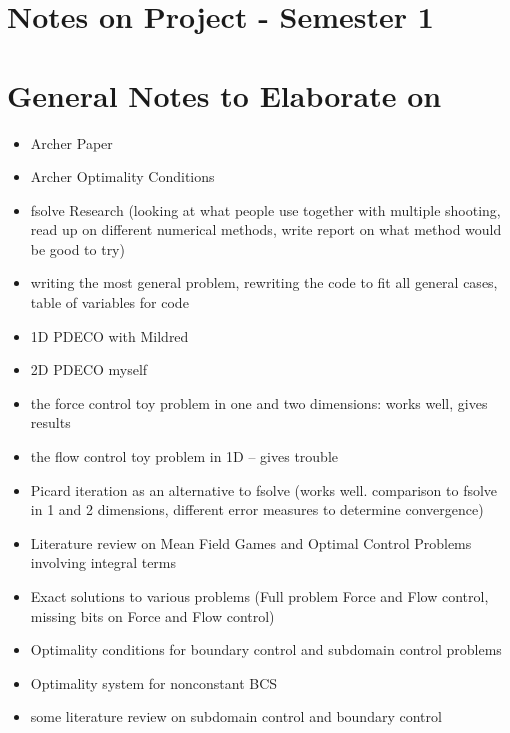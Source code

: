 \documentclass[11pt, a4paper]{article}
\theoremstyle{definition}
\begin{document}

\section*{Notes on Project - Semester 1}

\section{General Notes to Elaborate on}

\begin{itemize}
	\item Archer Paper
	\item Archer Optimality Conditions
	\item fsolve Research (looking at what people use together with multiple shooting, read up on different numerical methods, write report on what method would be good to try)
	\item writing the most general problem, rewriting the code to fit all general cases, table of variables for code
	\item 1D PDECO with Mildred 
	\item 2D PDECO myself
	\item the force control toy problem in one and two dimensions: works well, gives results
	\item the flow control toy problem in 1D -- gives trouble
	\item Picard iteration as an alternative to fsolve (works well. comparison to fsolve in 1 and 2 dimensions, different error measures to determine convergence)
	\item Literature review on Mean Field Games and Optimal Control Problems involving integral terms
	\item Exact solutions to various problems (Full problem Force and Flow control, missing bits on Force and Flow control)
	\item Optimality conditions for boundary control and subdomain control problems
	\item Optimality system for nonconstant BCS
	\item some literature review on subdomain control and boundary control 
\end{itemize}
\end{document}
